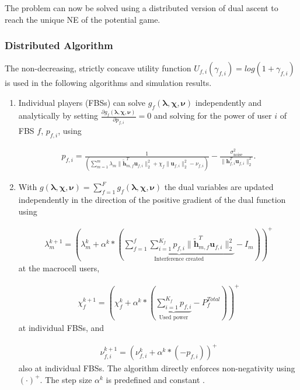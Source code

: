 The problem can now be solved using a distributed version of dual ascent to reach the unique NE of the potential game. 
\subsubsection{Distributed Algorithm}\label{algo1}
The non-decreasing, strictly concave utility function $U_{f,i}(\gamma_{f,i}) = log(1+\gamma_{f,i})$ 
is used in the following algorithms and simulation results.

\begin{enumerate}
\item 
Individual players (FBSs) can solve $ g_f(\boldsymbol{\lambda},\boldsymbol{\chi},\boldsymbol{\nu})$ independently and analytically by setting $\frac{\partial g_f(\boldsymbol{\lambda},\boldsymbol{\chi},\boldsymbol{\nu})}{\partial p_{f,i}} = 0$ 
and solving for the power of user $i$ of FBS $f$, $p_{f,i}$, using

\begin{gather}
p_{f,i} = \frac{1}{(\sum_{m=1}^{m}\lambda_{m}\|\tilde{\mathbf{h}}_{m,f}^T \mathbf{u}_{f,i}\|^2_2
+\chi_{f} \|\mathbf{u}_{f,i}\|^2_2
-\nu_{f,i}
 )}-
  \frac{\sigma^2_{\text{noise}}}{\|\mathbf{h}_{f,i}^T \mathbf{u}_{f,i}\|^2_2}.
\end{gather}

\item 
With $g(\boldsymbol{\lambda},\boldsymbol{\chi},\boldsymbol{\nu}) = \sum_{f=1}^{F}g_f(\boldsymbol{\lambda},\boldsymbol{\chi},\boldsymbol{\nu})$ the dual variables are updated independently in the direction of the positive gradient of the dual function using

\begin{gather}
\lambda_{m}^{k+1} = (
\lambda_{m}^{k}
+
\alpha^{k}*
(
\underbrace{
\sum _{f=1}^{f}
\sum _{i=1}^{K_{f}}
p_{f,i}
\|\tilde{\mathbf{h}}_{m,f}^T \mathbf{u}_{f,i}\|^2_2}_{\text{Interference created}}
- I_{m}
))^+
\end{gather}
 at the macrocell users,

\begin{gather}
\chi_{f}^{k+1} = (
\chi_{f}^{k}
+
\alpha^{k}*
(\underbrace{\sum_{i=1}^{K_{f}} p_{f,i}}_{\text{Used power}} - P_{f}^{Total}) )^+
\end{gather}
 at individual FBSs, and 

\begin{gather}
\nu_{f,i}^{k+1} = (
\nu_{f,i}^{k}
+
\alpha^{k}*
(-p_{f,i}))^+
\end{gather}
also at individual FBSs.
The algorithm directly enforces non-negativity using $(\cdot)^+$.
The step size $\alpha^{k}$ is predefined and constant .



\end{enumerate} 
